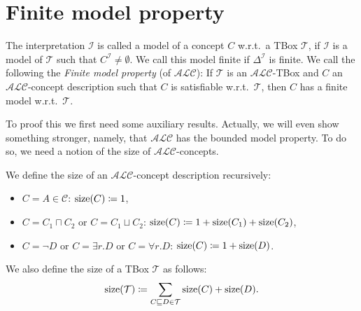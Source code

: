 \section{Finite model property}
\begin{definition}
	The interpretation $\mathcal{I}$ is called a model of a concept $C$ w.r.t.\ a TBox $\mathcal{T}$,
	if $\mathcal{I}$ is a model of $\mathcal{T}$ such that $C^{\mathcal{I}} \neq \emptyset$.
	We call this model finite if $\Delta^{\mathcal{I}}$ is finite.
	\newline
	We call the following the \textit{Finite model property} (of $\mathcal{ALC}$):
	\newline
	If $\mathcal{T}$ is an $\mathcal{ALC}$-TBox and $C$ an $\mathcal{ALC}$-concept description 
	such that $C$ is satisfiable w.r.t.\ $\mathcal{T}$,
	then $C$ has a finite model w.r.t.\ $\mathcal{T}$.
\end{definition}	
To proof this we first need some auxiliary results.
Actually, we will even show something stronger, namely, that $\mathcal{ALC}$ has the bounded model property.
To do so, we need a notion of the size of $\mathcal{ALC}$-concepts.

\begin{mdframed}[frametitle={Sizes in $\mathcal{ALC}$}]
	We define the size of an $\mathcal{ALC}$-concept description recursively:
	\begin{itemize}
		\item $C = A \in \mathscr{C}$: $\operatorname{\text{size}}(C) \coloneqq 1$,
		\item $C = C_1 \sqcap C_2$ or $C = C_1 \sqcup C_2$: $\operatorname{\text{size}}(C) \coloneqq 1 + \operatorname{\text{size}}(C_1) + \operatorname{\text{size}}(C_2)$,
		\item $C = \neg D$ or $C = \exists r.D$ or $C = \forall r.D$: $\operatorname{\text{size}}(C) \coloneqq 1 + \operatorname{\text{size}}(D)$.
	\end{itemize}
	We also define the size of a TBox $\mathcal{T}$ as follows:
	\[
		\func{size}(\mathcal{T}) \coloneqq \sum_{C \sqsubseteq D \in \mathcal{T}} \func{size}(C) + \func{size}(D)
	.\]
\end{mdframed}

